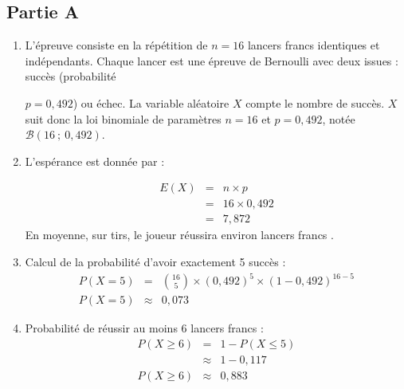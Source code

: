 \subsection*{Partie A}
\begin{enumerate}
\item L'épreuve consiste en la répétition de $n = 16$ lancers francs identiques et indépendants. Chaque lancer est une épreuve de Bernoulli avec deux issues : succès (probabilité 

$p = 0,492$) ou échec. La variable aléatoire $X$ compte le nombre de succès. $X$ suit donc la loi binomiale de paramètres $n = 16$ et $p = 0,492$, notée $\mathcal{B}(16~;~0,492)$.

\item L'espérance est donnée par :

\[\begin{array}{rcl}
E(X) &=& n \times p \\
&=& 16 \times 0,492 \\
&=& 7,872
\end{array}\]
En moyenne, sur  tirs, le joueur réussira environ  lancers francs .

\item Calcul de la probabilité d'avoir exactement 5 succès :
\[
\begin{array}{rcl}
P(X = 5) &=& \binom{16}{5} \times (0,492)^5 \times (1 - 0,492)^{16 - 5} \\
P(X = 5)&\approx& 0,073
\end{array}
\]

\item Probabilité de réussir au moins 6 lancers francs :
\[
\begin{array}{rcl}
P(X \geqslant 6) &=& 1 - P(X \leqslant 5) \\
&\approx& 1 - 0,117 \\
P(X \geqslant 6)&\approx& 0,883
\end{array}
\]
\end{enumerate}

